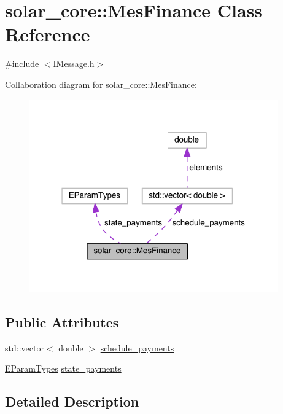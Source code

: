 \hypertarget{classsolar__core_1_1_mes_finance}{}\section{solar\+\_\+core\+:\+:Mes\+Finance Class Reference}
\label{classsolar__core_1_1_mes_finance}


{\ttfamily \#include $<$I\+Message.\+h$>$}



Collaboration diagram for solar\+\_\+core\+:\+:Mes\+Finance\+:
\nopagebreak
\begin{figure}[H]
\begin{center}
\leavevmode
\includegraphics[width=304pt]{classsolar__core_1_1_mes_finance__coll__graph}
\end{center}
\end{figure}
\subsection*{Public Attributes}
\begin{DoxyCompactItemize}
\item 
std\+::vector$<$ double $>$ \hyperlink{classsolar__core_1_1_mes_finance_aa5f0c5370821ad09da5aea0da9c03a29}{schedule\+\_\+payments}
\item 
\hyperlink{namespacesolar__core_aa1147341e5ef7a40d68d1bd68e149362}{E\+Param\+Types} \hyperlink{classsolar__core_1_1_mes_finance_a5411785779f982be49c7e14584ce2fe2}{state\+\_\+payments}
\end{DoxyCompactItemize}


\subsection{Detailed Description}


